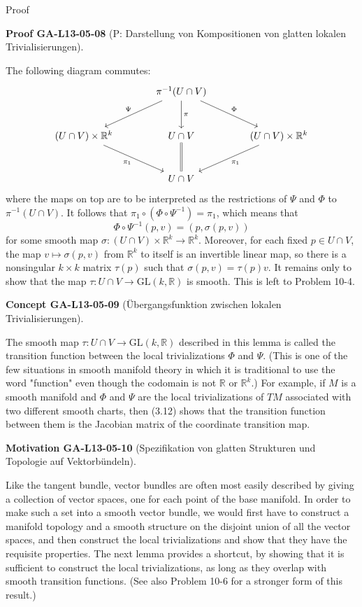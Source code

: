 \documentclass[10pt, letterpaper]{article}
\newcommand{\CustomHeading}[3]{%
  \par\medskip\noindent%
  \textbf{#1 #2} \textnormal{(#3)}.\enskip%
}
\newenvironment{CONC}[2]{\begin{unitbox}\CustomHeading{Concept}{#1}{#2}}{\end{unitbox}}
\newenvironment{MOT}[2]{\begin{unitbox}\CustomHeading{Motivation}{#1}{#2}}{\end{unitbox}}
\newenvironment{PROOF}[2]{\begin{unitbox}\CustomHeading{Proof}{#1}{#2}}{\end{unitbox}}
\begin{document}
Proof

\begin{PROOF}{GA-L13-05-08}{P: Darstellung von Kompositionen von glatten lokalen Trivialisierungen}
The following diagram commutes:
\[
\begin{tikzcd}[row sep=large, column sep=large]
& \pi^{-1}(U \cap V) \arrow[dl, "\Psi"'] \arrow[dr, "\Phi"] \arrow[d, "\pi"] & \\
(U \cap V) \times \mathbb{R}^k \arrow[dr, "\pi_1"'] & U \cap V \arrow[d, equal] & (U \cap V) \times \mathbb{R}^k \arrow[dl, "\pi_1"] \\
& U \cap V &
\end{tikzcd}
\]
where the maps on top are to be interpreted as the restrictions of $\Psi$ and $\Phi$ to $\pi^{-1}(U \cap V)$. It follows that $\pi_1 \circ\left(\Phi \circ \Psi^{-1}\right)=\pi_1$, which means that
$$
\Phi \circ \Psi^{-1}(p, v)=(p, \sigma(p, v))
$$
for some smooth map $\sigma:(U \cap V) \times \mathbb{R}^k \rightarrow \mathbb{R}^k$. Moreover, for each fixed $p \in U \cap V$, the map $v \mapsto \sigma(p, v)$ from $\mathbb{R}^k$ to itself is an invertible linear map, so there is a nonsingular $k \times k$ matrix $\tau(p)$ such that $\sigma(p, v)=\tau(p) v$. It remains only to show that the map $\tau: U \cap V \rightarrow \mathrm{GL}(k, \mathbb{R})$ is smooth. This is left to Problem 10-4.
\end{PROOF}


\begin{CONC}{GA-L13-05-09}{Übergangsfunktion zwischen lokalen Trivialisierungen}
The smooth map $\tau: U \cap V \rightarrow \mathrm{GL}(k, \mathbb{R})$ described in this lemma is called the transition function between the local trivializations $\Phi$ and $\Psi$. (This is one of the few situations in smooth manifold theory in which it is traditional to use the word "function" even though the codomain is not $\mathbb{R}$ or $\mathbb{R}^k$.) For example, if $M$ is a smooth manifold and $\Phi$ and $\Psi$ are the local trivializations of $T M$ associated with two different smooth charts, then (3.12) shows that the transition function between them is the Jacobian matrix of the coordinate transition map.
\end{CONC}



\begin{MOT}{GA-L13-05-10}{Spezifikation von glatten Strukturen und Topologie auf Vektorbündeln}
Like the tangent bundle, vector bundles are often most easily described by giving a collection of vector spaces, one for each point of the base manifold. In order to make such a set into a smooth vector bundle, we would first have to construct a manifold topology and a smooth structure on the disjoint union of all the vector spaces, and then construct the local trivializations and show that they have the requisite properties. The next lemma provides a shortcut, by showing that it is sufficient to construct the local trivializations, as long as they overlap with smooth transition functions. (See also Problem 10-6 for a stronger form of this result.)
\end{MOT}
\end{document}
